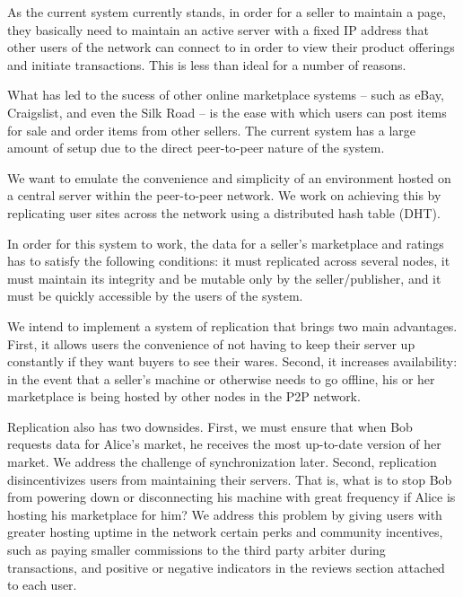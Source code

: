 \documentclass[11pt,twocolumn]{article}
\begin{document}
As the current system currently stands, in order for a seller to maintain a page, they basically need to maintain an active server with a fixed IP address that other users of the network can connect to in order to view their product offerings and initiate transactions.
This is less than ideal for a number of reasons.

What has led to the sucess of other online marketplace systems -- such as eBay, Craigslist, and even the Silk Road -- is the ease with which users can post items for sale and order items from other sellers.
The current system has a large amount of setup due to the direct peer-to-peer nature of the system.

We want to emulate the convenience and simplicity of an environment hosted on a central server within the peer-to-peer network.
We work on achieving this by replicating user sites across the network using a distributed hash table (DHT).

In order for this system to work, the data for a seller's marketplace and ratings has to satisfy the following conditions: it must replicated across several nodes, it must maintain its integrity and be mutable only by the seller/publisher, and it must be quickly accessible by the users of the system.

We intend to implement a system of replication that brings two main advantages.
First, it allows users the convenience of not having to keep their server up constantly if they want buyers to see their wares.
Second, it increases availability: in the event that a seller's machine or otherwise needs to go offline, his or her marketplace is being hosted by other nodes in the P2P network.

Replication also has two downsides.
First, we must ensure that when Bob requests data for Alice's market, he receives the most up-to-date version of her market. We address the challenge of synchronization later.
Second, replication disincentivizes users from maintaining their servers. That is, what is to stop Bob from powering down or disconnecting his machine with great frequency if Alice is hosting his marketplace for him? We address this problem by giving users with greater hosting uptime in the network certain perks and community incentives, such as paying smaller commissions to the third party arbiter during transactions, and positive or negative indicators in the reviews section attached to each user.
\end{document}
